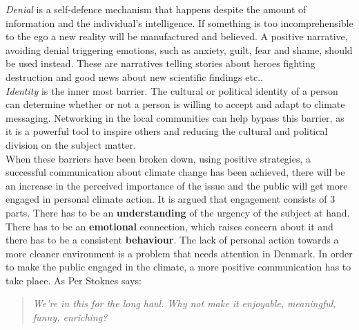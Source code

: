         \textit{Denial} is a self-defence mechanism that happens despite the amount of information and the individual's intelligence\citep[p.~109]{storyAboutClimateChange}. If something is too incomprehensible to the ego a new reality will be manufactured and believed. A positive narrative, avoiding denial triggering emotions, such as anxiety, guilt, fear and shame, should be used instead. These are narratives telling stories about heroes fighting destruction and good news about new scientific findings etc.\cite{the5Ds}.\\
        
        \textit{Identity} is the inner most barrier. The cultural or political identity of a person can determine whether or not a person is willing to accept and adapt to climate messaging\citep[p.~109]{storyAboutClimateChange}. Networking in the local communities can help bypass this barrier, as it is a powerful tool to inspire others and reducing the cultural and political division on the subject matter\citep[p.~133]{storyAboutClimateChange}\cite{the5Ds}.\\
        
        When these barriers have been broken down, using positive strategies, a successful communication about climate change has been achieved, there will be an increase in the perceived importance of the issue and the public will get more engaged in personal climate action\cite{the5Ds}. It is argued that engagement consists of 3 parts. There has to be an \textbf{understanding} of the urgency of the subject at hand. There has to be an \textbf{emotional} connection, which raises concern about it and there has to be a consistent \textbf{behaviour}\cite{climateChangeEngagement3Elements, vrEngagementClimateChange, reorientingClimageChangeCommunication}. The lack of personal action towards a more cleaner environment is a problem that needs attention in Denmark. In order to make the public engaged in the climate, a more positive communication has to take place. As Per Stoknes says: 
        \begin{quote}
            \textit{We’re in this for the long haul. Why not make it enjoyable, meaningful, funny, enriching?}\citep[p.~117]{storyAboutClimateChange}
        \end{quote}
        
